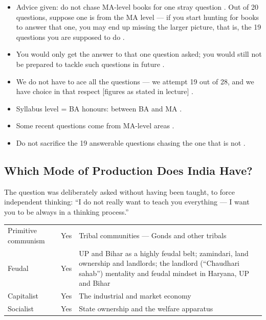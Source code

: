 \begin{CriticalPoint}
\begin{itemize}
    \item Advice given: do not chase MA-level books for one stray question . Out of 20 questions, suppose one is from the MA level --- if you start hunting for books to answer that one, you may end up missing the larger picture, that is, the 19 questions you are supposed to do .
    \item You would only get the answer to that one question asked; you would still not be prepared to tackle such questions in future .
    \item We do not have to ace all the questions --- we attempt 19 out of 28, and we have choice in that respect [figures as stated in lecture] .
\end{itemize}
\end{CriticalPoint}

\begin{QuickRevision}
\begin{itemize}
    \item Syllabus level = BA honours: between BA and MA .
    \item Some recent questions come from MA-level areas .
    \item Do not sacrifice the 19 answerable questions chasing the one that is not .
\end{itemize}
\end{QuickRevision}

\subsection{Which Mode of Production Does India Have?}
The question was deliberately asked without having been taught, to force independent thinking: ``I do not really want to teach you everything --- I want you to be always in a thinking process.'' 

\begin{table}[h!]
\centering
\begin{tabularx}{\textwidth}{lYY}
\toprule
{}
 &  &  \\
\midrule
Primitive communism & Yes & Tribal communities --- Gonds and other tribals \\
Feudal & Yes & UP and Bihar as a highly feudal belt; zamindari, land ownership and landlords; the landlord (``Chaudhari sahab'') mentality and feudal mindset in Haryana, UP and Bihar \\
Capitalist & Yes & The industrial and market economy \\
Socialist & Yes & State ownership and the welfare apparatus \\
\bottomrule
\end{tabularx}
\end{table}

